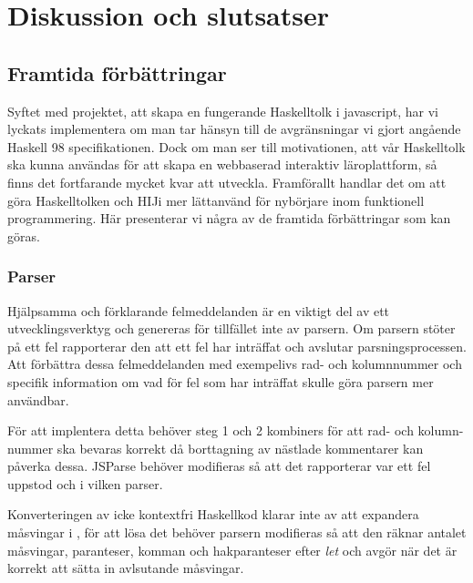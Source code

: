 \section{Diskussion och slutsatser}




\subsection{Framtida förbättringar}

Syftet med projektet, att skapa en fungerande Haskelltolk i javascript, har vi lyckats implementera om man tar hänsyn till de avgränsningar vi gjort angående Haskell 98 specifikationen. Dock om man ser till motivationen, att vår Haskelltolk ska kunna användas för att skapa en webbaserad interaktiv läroplattform, så finns det fortfarande mycket kvar att utveckla. Framförallt handlar det om att göra Haskelltolken och HIJi mer lättanvänd för nybörjare inom funktionell programmering. Här presenterar vi några av de framtida förbättringar som kan göras.

\subsubsection{Parser}
Hjälpsamma och förklarande felmeddelanden är en viktigt del av ett utvecklingsverktyg och genereras för tillfället inte av parsern. 
Om parsern stöter på ett fel rapporterar den att ett fel har inträffat och avslutar parsningsprocessen. 
Att förbättra dessa felmeddelanden med exempelivs rad- och kolumnnummer och specifik information om vad för fel som har inträffat skulle göra parsern mer användbar.

För att implentera detta behöver steg 1 och 2 kombiners för att rad- och kolumn-nummer ska bevaras korrekt då borttagning av nästlade kommentarer kan påverka dessa. 
JSParse behöver modifieras så att det rapporterar var ett fel uppstod och i vilken parser.

Konverteringen av icke kontextfri Haskellkod klarar inte av att expandera måsvingar i \empth{[x | let x = 5]},
för att lösa det behöver parsern modifieras så att den räknar antalet måsvingar, paranteser, komman och hakparanteser efter
\emph{let} och avgör när det är korrekt att sätta in avlsutande måsvingar.

